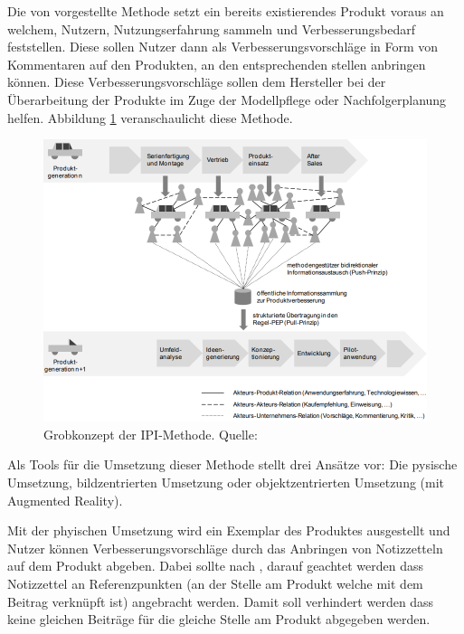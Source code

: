 Die von \citeauthor{Kirschner2012} vorgestellte Methode setzt ein bereits existierendes Produkt voraus an welchem,  Nutzern,  Nutzungserfahrung sammeln und Verbesserungsbedarf feststellen. 
Diese sollen Nutzer dann als Verbesserungsvorschläge in Form von Kommentaren auf den Produkten, an den entsprechenden stellen anbringen können. Diese Verbesserungsvorschläge sollen dem Hersteller
bei der Überarbeitung der Produkte im Zuge der Modellpflege oder Nachfolgerplanung helfen. Abbildung \ref{img:ipimethode} veranschaulicht diese Methode. \cite[S.~122]{Kirschner2012}

\begin{figure}[H]
	\centering
	\includegraphics[width=1.0\textwidth]{resources/analyse/IPI_methode.png}
	\caption{Grobkonzept der IPI-Methode. Quelle:\cite[S.~128]{Kirschner2012}}
	\label{img:ipimethode}
\end{figure}

Als Tools für die Umsetzung dieser Methode stellt \citeauthor{Kirschner2012} drei Ansätze vor: Die pysische Umsetzung, bildzentrierten Umsetzung oder objektzentrierten Umsetzung (mit Augmented Reality). 

Mit der phyischen Umsetzung wird ein Exemplar des Produktes ausgestellt und Nutzer können Verbesserungsvorschläge durch das Anbringen von Notizzetteln auf dem Produkt abgeben. 
Dabei sollte nach \citeauthor{Kirschner2012}, darauf geachtet werden dass Notizzettel an Referenzpunkten (an der Stelle am Produkt welche mit dem Beitrag verknüpft ist) angebracht werden. Damit 
soll verhindert werden dass keine gleichen Beiträge für die gleiche Stelle am Produkt abgegeben werden. 

